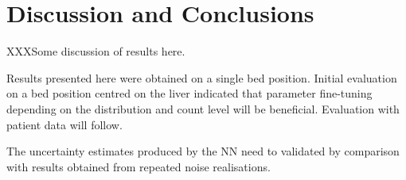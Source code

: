     
    


\section{Discussion and Conclusions} \label{sec:discussion_and_conclusions}
    XXXSome discussion of results here.

    Results presented here were obtained on a single bed position. Initial evaluation on a bed position centred on the liver indicated that parameter fine-tuning depending on the distribution and count level will be beneficial. Evaluation with patient data will follow.
    
    The uncertainty estimates produced by the \gls{NN} need to validated by comparison with results obtained from repeated noise realisations.
    
